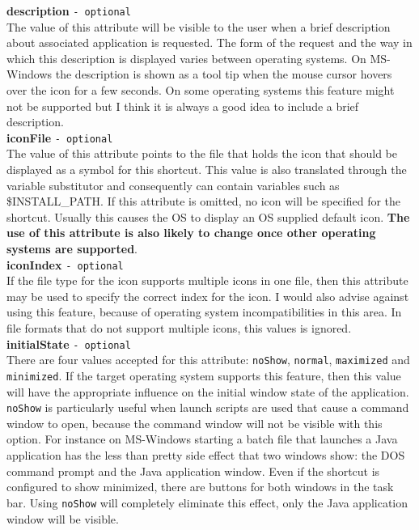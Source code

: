 \textbf{description} \texttt{- optional}\\

The value of this attribute will be visible to the user when a brief
description about associated application is requested. The form of the
request and the way in which this description is displayed varies
between operating systems. On MS-Windows the description is shown as a
tool tip when the mouse cursor hovers over the icon for a few seconds.
On some operating systems this feature might not be supported but I
think it is always a good idea to include a brief description.\\

\textbf{iconFile} \texttt{- optional}\\

The value of this attribute points to the file that holds the icon that
should be displayed as a symbol for this shortcut. This value is also
translated through the variable substitutor and consequently can contain
variables such as \$INSTALL\_PATH. If this attribute is omitted, no icon
will be specified for the shortcut. Usually this causes the OS to
display an OS supplied default icon. \textbf{The use of this attribute
is also likely to change once other operating systems are supported}.\\

\textbf{iconIndex} \texttt{- optional}\\

If the file type for the icon supports multiple icons in one file, then
this attribute may be used to specify the correct index for the icon. I
would also advise against using this feature, because of operating
system incompatibilities in this area. In file formats that do not
support multiple icons, this values is ignored.\\

\textbf{initialState} \texttt{- optional}\\

There are four values accepted for this attribute: \texttt{noShow},
\texttt{normal}, \texttt{maximized} and \texttt{minimized}. If the
target operating system supports this feature, then this value will have
the appropriate influence on the initial window state of the
application. \texttt{noShow} is particularly useful when launch scripts
are used that cause a command window to open, because the command window
will not be visible with this option. For instance on MS-Windows
starting a batch file that launches a Java application has the less than
pretty side effect that two windows show: the DOS command prompt and the
Java application window. Even if the shortcut is configured to show
minimized, there are buttons for both windows in the task bar. Using
\texttt{noShow} will completely eliminate this effect, only the Java
application window will be visible.\\

